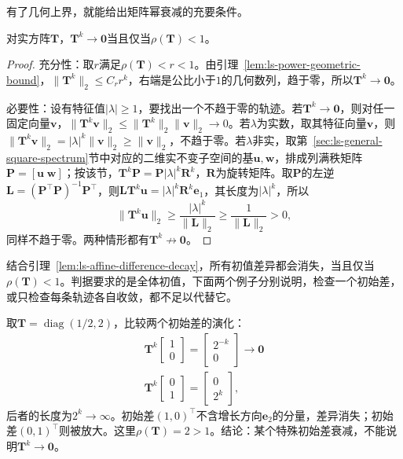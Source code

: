 有了几何上界，就能给出矩阵幂衰减的充要条件。
\begin{theorem}[矩阵幂的衰减判据]
\label{thm:ls-power-decay}
对实方阵$\bm T$，$\bm T^k\to\bm0$当且仅当$\rho(\bm T)<1$。
\end{theorem}
\begin{proof}
充分性：取$r$满足$\rho(\bm T)<r<1$。由引理~\ref{lem:ls-power-geometric-bound}，$\lVert\bm T^k\rVert_2\leq C_rr^k$，右端是公比小于$1$的几何数列，趋于零，所以$\bm T^k\to\bm0$。

必要性：设有特征值$|\lambda|\geq1$，要找出一个不趋于零的轨迹。若$\bm T^k\to\bm0$，则对任一固定向量$\bm v$，$\lVert\bm T^k\bm v\rVert_2\leq\lVert\bm T^k\rVert_2\lVert\bm v\rVert_2\to0$。若$\lambda$为实数，取其特征向量$\bm v$，则$\lVert\bm T^k\bm v\rVert_2=|\lambda|^k\lVert\bm v\rVert_2\geq\lVert\bm v\rVert_2$，不趋于零。若$\lambda$非实，取第~\ref{sec:ls-general-square-spectrum}节中对应的二维实不变子空间的基$\bm u,\bm w$，排成列满秩矩阵$\bm P=[\bm u\;\bm w]$；按该节，$\bm T^k\bm P=\bm P|\lambda|^k\bm R^k$，$\bm R$为旋转矩阵。取$\bm P$的左逆$\bm L=(\bm P^\top\bm P)^{-1}\bm P^\top$，则$\bm L\bm T^k\bm u=|\lambda|^k\bm R^k\bm e_1$，其长度为$|\lambda|^k$，所以
\[
 \lVert\bm T^k\bm u\rVert_2\geq\frac{|\lambda|^k}{\lVert\bm L\rVert_2}\geq\frac1{\lVert\bm L\rVert_2}>0,
\]
同样不趋于零。两种情形都有$\bm T^k\not\to\bm0$。
\end{proof}
结合引理~\ref{lem:ls-affine-difference-decay}，所有初值差异都会消失，当且仅当$\rho(\bm T)<1$。判据要求的是全体初值，下面两个例子分别说明，检查一个初始差，或只检查每条轨迹各自收敛，都不足以代替它。

\begin{example}[反例：一个初始差衰减不能说明全部衰减]
\label{ex:ls-partial-convergence}
取$\bm T=\operatorname{diag}(1/2,2)$，比较两个初始差的演化：
\[
\begin{gathered}
\bm T^k\begin{bmatrix}1\\0\end{bmatrix}=\begin{bmatrix}2^{-k}\\0\end{bmatrix}\to\bm0\\
\bm T^k\begin{bmatrix}0\\1\end{bmatrix}=\begin{bmatrix}0\\2^k\end{bmatrix},
\end{gathered}
\]
后者的长度为$2^k\to\infty$。初始差$(1,0)^\top$不含增长方向$\bm e_2$的分量，差异消失；初始差$(0,1)^\top$则被放大。这里$\rho(\bm T)=2>1$。结论：某个特殊初始差衰减，不能说明$\bm T^k\to\bm0$。
\end{example}

